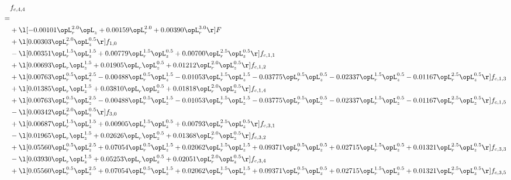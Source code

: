 \begin{alignat}{2} 
\label{eq:f_44_1} 
& f_{c,4,4} \nonumber \\ 
 = \\ 
& + \l[  -0.00101 \opL_r^{2.0} \opL_z +  0.00159 \opL_r^{2.0} +  0.00390 \opL_r^{3.0}  \r] F \nonumber \\ 
& + \l[  0.00303 \opL_r^{2.0} \opL_z^{0.5}  \r] f_{1,0} \nonumber \\ 
& - \l[  0.00351 \opL_r^{1.5} \opL_z^{1.5} +  0.00779 \opL_r^{1.5} \opL_z^{0.5} +  0.00700 \opL_r^{2.5} \opL_z^{0.5}  \r] f_{c,1,1} \nonumber \\ 
& + \l[  0.00693 \opL_r \opL_z^{1.5} +  0.01905 \opL_r \opL_z^{0.5} +  0.01212 \opL_r^{2.0} \opL_z^{0.5}  \r] f_{c,1,2} \nonumber \\ 
& + \l[  0.00763 \opL_r^{0.5} \opL_z^{2.5}   -0.00488 \opL_r^{0.5} \opL_z^{1.5}   -0.01053 \opL_r^{1.5} \opL_z^{1.5}   -0.03775 \opL_r^{0.5} \opL_z^{0.5}   -0.02337 \opL_r^{1.5} \opL_z^{0.5}   -0.01167 \opL_r^{2.5} \opL_z^{0.5}  \r] f_{c,1,3} \nonumber \\ 
& + \l[  0.01385 \opL_r \opL_z^{1.5} +  0.03810 \opL_r \opL_z^{0.5} +  0.01818 \opL_r^{2.0} \opL_z^{0.5}  \r] f_{c,1,4} \nonumber \\ 
& + \l[  0.00763 \opL_r^{0.5} \opL_z^{2.5}   -0.00488 \opL_r^{0.5} \opL_z^{1.5}   -0.01053 \opL_r^{1.5} \opL_z^{1.5}   -0.03775 \opL_r^{0.5} \opL_z^{0.5}   -0.02337 \opL_r^{1.5} \opL_z^{0.5}   -0.01167 \opL_r^{2.5} \opL_z^{0.5}  \r] f_{c,1,5} \nonumber \\ 
& - \l[  0.00342 \opL_r^{2.0} \opL_z^{0.5}  \r] f_{3,0} \nonumber \\ 
& + \l[  0.00687 \opL_r^{1.5} \opL_z^{1.5} +  0.00905 \opL_r^{1.5} \opL_z^{0.5} +  0.00793 \opL_r^{2.5} \opL_z^{0.5}  \r] f_{c,3,1} \nonumber \\ 
& - \l[  0.01965 \opL_r \opL_z^{1.5} +  0.02626 \opL_r \opL_z^{0.5} +  0.01368 \opL_r^{2.0} \opL_z^{0.5}  \r] f_{c,3,2} \nonumber \\ 
& + \l[  0.05560 \opL_r^{0.5} \opL_z^{2.5} +  0.07054 \opL_r^{0.5} \opL_z^{1.5} +  0.02062 \opL_r^{1.5} \opL_z^{1.5} +  0.09371 \opL_r^{0.5} \opL_z^{0.5} +  0.02715 \opL_r^{1.5} \opL_z^{0.5} +  0.01321 \opL_r^{2.5} \opL_z^{0.5}  \r] f_{c,3,3} \nonumber \\ 
& - \l[  0.03930 \opL_r \opL_z^{1.5} +  0.05253 \opL_r \opL_z^{0.5} +  0.02051 \opL_r^{2.0} \opL_z^{0.5}  \r] f_{c,3,4} \nonumber \\ 
& + \l[  0.05560 \opL_r^{0.5} \opL_z^{2.5} +  0.07054 \opL_r^{0.5} \opL_z^{1.5} +  0.02062 \opL_r^{1.5} \opL_z^{1.5} +  0.09371 \opL_r^{0.5} \opL_z^{0.5} +  0.02715 \opL_r^{1.5} \opL_z^{0.5} +  0.01321 \opL_r^{2.5} \opL_z^{0.5}  \r] f_{c,3,5} \nonumber \\ 

\end{alignat}
